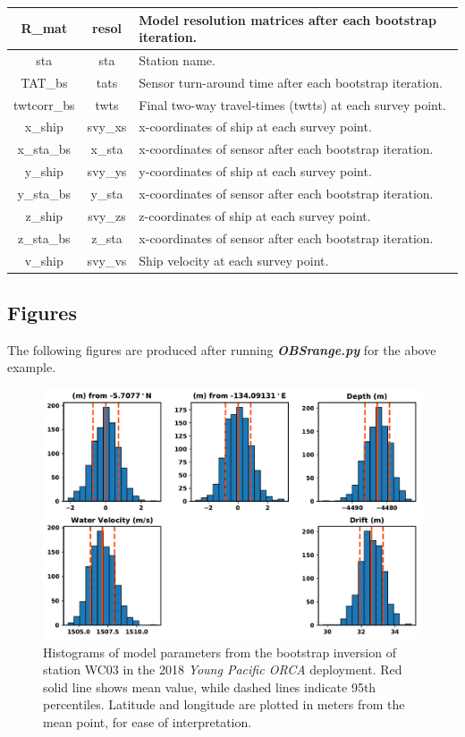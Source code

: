 \documentclass[titlepage, 12pt]{article}
\begin{document}
\begin{table}[!htb]
\begin{tabularx}{\linewidth}{|c|c|X|}
    R\_mat          & resol      & Model resolution matrices after each bootstrap iteration. \\ \hline
    sta             & sta        & Station name. \\ \hline
    TAT\_bs         & tats       & Sensor turn-around time after each bootstrap iteration. \\ \hline
    twtcorr\_bs     & twts       & Final two-way travel-times (twtts) at each survey point. \\ \hline
    x\_ship         & svy\_xs    & x-coordinates of ship at each survey point. \\ \hline
    x\_sta\_bs      & x\_sta     & x-coordinates of sensor after each bootstrap iteration. \\ \hline
    y\_ship         & svy\_ys    & y-coordinates of ship at each survey point. \\ \hline
    y\_sta\_bs      & y\_sta     & x-coordinates of sensor after each bootstrap iteration. \\ \hline
    z\_ship         & svy\_zs    & z-coordinates of ship at each survey point. \\ \hline
    z\_sta\_bs      & z\_sta     & x-coordinates of sensor after each bootstrap iteration. \\ \hline
    v\_ship         & svy\_vs    & Ship velocity at each survey point. \\ \hline
    \end{tabularx}
   \end{table}
  
  \newpage

  \subsection{Figures}
  The following figures are produced after running \textit{\textbf{OBSrange.py}} for the above example.

  \begin{figure}[!htb]
   \centering
   \includegraphics[width=0.8\linewidth]{histograms.pdf}
   \caption{Histograms of model parameters from the bootstrap inversion of station WC03 in the 2018 \textit{Young Pacific ORCA} deployment. Red solid line shows mean value, while dashed lines indicate 95th percentiles. Latitude and longitude are plotted in meters from the mean point, for ease of interpretation.}
  \end{figure}
\end{document}
